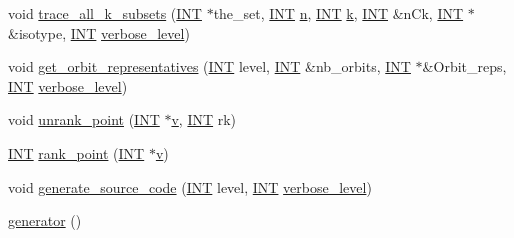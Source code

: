 \begin{DoxyCompactItemize}
\item 
void \mbox{\hyperlink{classgenerator_a1fd0b36d851eb2d4e9042b8a25b951c0}{trace\+\_\+all\+\_\+k\+\_\+subsets}} (\mbox{\hyperlink{galois_8h_a09fddde158a3a20bd2dcadb609de11dc}{I\+NT}} $\ast$the\+\_\+set, \mbox{\hyperlink{galois_8h_a09fddde158a3a20bd2dcadb609de11dc}{I\+NT}} \mbox{\hyperlink{simeon_8_c_a7f2cd26777ce0ff3fdaf8d02aacbddfb}{n}}, \mbox{\hyperlink{galois_8h_a09fddde158a3a20bd2dcadb609de11dc}{I\+NT}} \mbox{\hyperlink{simeon_8_c_a43fa990200c3ddd47c35f151bd4d66bf}{k}}, \mbox{\hyperlink{galois_8h_a09fddde158a3a20bd2dcadb609de11dc}{I\+NT}} \&n\+Ck, \mbox{\hyperlink{galois_8h_a09fddde158a3a20bd2dcadb609de11dc}{I\+NT}} $\ast$\&isotype, \mbox{\hyperlink{galois_8h_a09fddde158a3a20bd2dcadb609de11dc}{I\+NT}} \mbox{\hyperlink{classgenerator_a7fedc6488314cbc00dbfcc42d311e1ce}{verbose\+\_\+level}})
\item 
void \mbox{\hyperlink{classgenerator_a10b4d5109d52d78991b71870c32e4bcd}{get\+\_\+orbit\+\_\+representatives}} (\mbox{\hyperlink{galois_8h_a09fddde158a3a20bd2dcadb609de11dc}{I\+NT}} level, \mbox{\hyperlink{galois_8h_a09fddde158a3a20bd2dcadb609de11dc}{I\+NT}} \&nb\+\_\+orbits, \mbox{\hyperlink{galois_8h_a09fddde158a3a20bd2dcadb609de11dc}{I\+NT}} $\ast$\&Orbit\+\_\+reps, \mbox{\hyperlink{galois_8h_a09fddde158a3a20bd2dcadb609de11dc}{I\+NT}} \mbox{\hyperlink{classgenerator_a7fedc6488314cbc00dbfcc42d311e1ce}{verbose\+\_\+level}})
\item 
void \mbox{\hyperlink{classgenerator_ad8842983b197430759b0588712c26693}{unrank\+\_\+point}} (\mbox{\hyperlink{galois_8h_a09fddde158a3a20bd2dcadb609de11dc}{I\+NT}} $\ast$\mbox{\hyperlink{simeon_8_c_aeb3f3030944801b163bc3b829a7f6710}{v}}, \mbox{\hyperlink{galois_8h_a09fddde158a3a20bd2dcadb609de11dc}{I\+NT}} rk)
\item 
\mbox{\hyperlink{galois_8h_a09fddde158a3a20bd2dcadb609de11dc}{I\+NT}} \mbox{\hyperlink{classgenerator_a3107f7b3bfa9d64eb32fc2258b98fe61}{rank\+\_\+point}} (\mbox{\hyperlink{galois_8h_a09fddde158a3a20bd2dcadb609de11dc}{I\+NT}} $\ast$\mbox{\hyperlink{simeon_8_c_aeb3f3030944801b163bc3b829a7f6710}{v}})
\item 
void \mbox{\hyperlink{classgenerator_a927aa5ef3dbe7bfc7f3415bf005620ed}{generate\+\_\+source\+\_\+code}} (\mbox{\hyperlink{galois_8h_a09fddde158a3a20bd2dcadb609de11dc}{I\+NT}} level, \mbox{\hyperlink{galois_8h_a09fddde158a3a20bd2dcadb609de11dc}{I\+NT}} \mbox{\hyperlink{classgenerator_a7fedc6488314cbc00dbfcc42d311e1ce}{verbose\+\_\+level}})
\item 
\mbox{\hyperlink{classgenerator_a474d415a403859769a80588f08048152}{generator}} ()

\end{DoxyCompactItemize}
